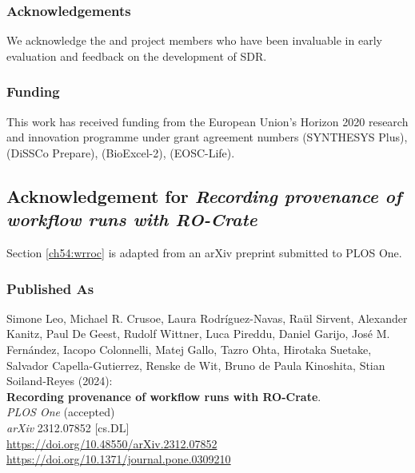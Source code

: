 \subsubsection*{Acknowledgements}

We acknowledge the  and
 project members who have been
invaluable in early evaluation and feedback on the development of SDR.

\subsubsection*{Funding}

This work has received funding from the European Union's Horizon 2020
research and innovation programme under grant agreement numbers
(SYNTHESYS Plus),  (DiSSCo
Prepare),  (BioExcel-2),
 (EOSC-Life).



\subsection{Acknowledgement for \emph{Recording provenance of workflow runs with RO-Crate}}
\label{ch11:wrroc}

Section \vref{ch54:wrroc} is adapted from an arXiv preprint submitted to PLOS One.

\subsubsection*{Published As}

Simone Leo, Michael R. Crusoe, Laura Rodríguez-Navas, Raül Sirvent, Alexander Kanitz, Paul De Geest, Rudolf Wittner, Luca Pireddu, Daniel Garijo, José M. Fernández, Iacopo Colonnelli, Matej Gallo, Tazro Ohta, Hirotaka Suetake, Salvador Capella-Gutierrez, Renske de Wit, Bruno de Paula Kinoshita, Stian Soiland-Reyes (2024): \\
\textbf{Recording provenance of workflow runs with RO-Crate}.\\
\emph{PLOS One} (accepted)  \\
\emph{arXiv} 2312.07852 [cs.DL] \\
\url{https://doi.org/10.48550/arXiv.2312.07852} \\
\url{https://doi.org/10.1371/journal.pone.0309210}

